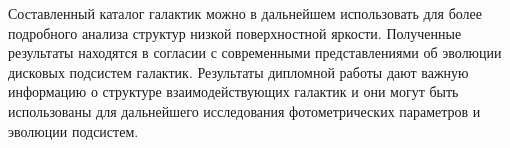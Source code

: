 Составленный каталог галактик можно в дальнейшем использовать для более подробного анализа структур низкой поверхностной яркости. Полученные результаты находятся в согласии с современными представлениями об эволюции дисковых подсистем галактик. Результаты дипломной работы дают важную информацию о структуре взаимодействующих галактик и они могут быть использованы для дальнейшего исследования фотометрических параметров и эволюции подсистем. 
